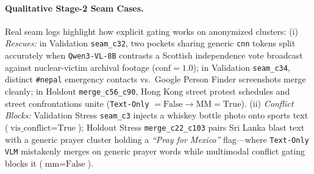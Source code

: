 \paragraph{Qualitative Stage-2 Seam Cases.}
Real seam logs highlight how explicit gating works on anonymized clusters: (i) \emph{Rescues:} in Validation \texttt{seam\_c32}, two pockets sharing generic \texttt{cnn} tokens split accurately when \texttt{Qwen3-VL-8B} contrasts a Scottish independence vote broadcast against nuclear-victim archival footage ($\text{conf}=1.0$); in Validation \texttt{seam\_c34}, distinct \texttt{\#nepal} emergency contacts vs.\ Google Person Finder screenshots merge cleanly; in Holdout \texttt{merge\_c56\_c90}, Hong Kong street protest schedules and street confrontations unite (\texttt{Text-Only} $= \text{False} \to \text{MM} = \text{True}$). (ii) \emph{Conflict Blocks:} Validation Stress \texttt{seam\_c3} injects a whiskey bottle photo onto sports text ($\text{vis\_conflict} = \text{True}$); Holdout Stress \texttt{merge\_c22\_c103} pairs Sri Lanka blast text with a generic prayer cluster holding a \emph{``Pray for Mexico''} flag---where \texttt{Text-Only VLM} mistakenly merges on generic prayer words while multimodal conflict gating blocks it ($\text{mm} = \text{False}$).
